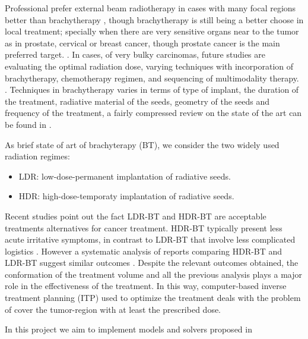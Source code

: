 \documentclass[12pt]{article}
\theoremstyle{definition}
\begin{document}
Professional prefer external beam radiotherapy in cases with many focal regions better than brachytherapy \cite{Thomas20XX}, though brachytherapy is still being a better choose in local treatment; specially when there are very sensitive organs near to the tumor as in prostate, cervical or breast cancer\cite{cozzi2018advantages,kamrava2017american,kalaghchi2018high,rospond2018ruthenium}, though prostate cancer is the main preferred target\cite{zaorsky2017}. \cite{shen2012}.
 In cases, of very bulky carcinomas, future studies are evaluating the optimal radiation dose, varying
techniques with incorporation of brachytherapy, chemotherapy regimen, and
sequencing of multimodality therapy. \cite{wong2008combined}. Techniques in brachytherapy varies in terms of type of implant, the duration of the treatment, radiative material of the seeds, geometry of the seeds and frequency of the treatment, a fairly compressed review on the state of the art can be found in \cite{dahiya2016,koukourakis2009}.%
\par
As brief state of art of brachyterapy (BT), we consider the two widely used radiation regimes: 
\begin{itemize}
\item LDR: low-dose-permanent implantation of radiative seeds. 
\item HDR: high-dose-temporaty implantation of radiative seeds.
\end{itemize}
Recent studies point out the fact LDR-BT and HDR-BT are acceptable treatments alternatives for cancer treatment. HDR-BT typically present less acute irritative symptoms, in contrast to LDR-BT that involve less complicated logistics \cite{zaorsky2017}. However a systematic analysis of reports comparing HDR-BT and LDR-BT suggest similar outcomes \cite{zaorsky2017}. Despite the relevant outcomes obtained, the conformation of the treatment volume and all the previous analysis plays a major role in the effectiveness of the treatment. In this way, computer-based inverse treatment planning (ITP) used to optimize the treatment deals with the problem of cover the tumor-region with at least the prescribed dose.\par
In this project we aim to implement models and solvers proposed in \cite{phdthesis}
\end{document}
